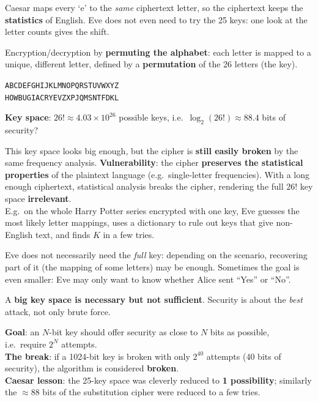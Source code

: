 \begin{rembox}[title=Why it works]
Caesar maps every `e' to the \emph{same} ciphertext letter, so the ciphertext keeps the
\textbf{statistics} of English. Eve does not even need to try the 25 keys: one look at the
letter counts gives the shift.
\end{rembox}

\begin{defnbox}[title=Substitution cipher]
Encryption/decryption by \textbf{permuting the alphabet}: each letter is mapped to a
unique, different letter, defined by a \textbf{permutation} of the 26 letters (the key).
\begin{center}
\texttt{ABCDEFGHIJKLMNOPQRSTUVWXYZ} \\
\texttt{HOWBUGIACRYEVZXPJQMSNTFDKL}
\end{center}
\textbf{Key space}: $26! \approx 4.03 \times 10^{26}$ possible keys, i.e.\
$\log_2(26!) \approx 88.4$ bits of security?
\end{defnbox}

\begin{warnbox}[title={The flaw, again}]
This key space looks big enough, but the cipher is \textbf{still easily broken} by the
same frequency analysis. \textbf{Vulnerability}: the cipher \textbf{preserves the
statistical properties} of the plaintext language (e.g.\ single-letter frequencies). With
a long enough ciphertext, statistical analysis breaks the cipher, rendering the full $26!$
key space \textbf{irrelevant}. \\
E.g.\ on the whole Harry Potter series encrypted with one key, Eve guesses the most
likely letter mappings, uses a dictionary to rule out keys that give non-English text,
and finds $K$ in a few tries.
\end{warnbox}

\begin{rembox}[title=Goal of the adversary]
Eve does not necessarily need the \emph{full} key: depending on the scenario, recovering
part of it (the mapping of some letters) may be enough. Sometimes the goal is even
smaller: Eve may only want to know whether Alice sent ``Yes'' or ``No''.
\end{rembox}

\begin{keybox}[title=Lesson]
A \textbf{big key space is necessary but not sufficient}. Security is about the
\emph{best} attack, not only brute force.
\end{keybox}

\begin{defnbox}[title=Bits of security]
\textbf{Goal}: an $N$-bit key should offer security as close to $N$ bits as possible,
i.e.\ require $2^N$ attempts. \\
\textbf{The break}: if a 1024-bit key is broken with only $2^{40}$ attempts (40 bits of
security), the algorithm is considered \textbf{broken}. \\
\textbf{Caesar lesson}: the 25-key space was cleverly reduced to \textbf{1 possibility};
similarly the $\approx 88$ bits of the substitution cipher were reduced to a few tries.
\end{defnbox}

